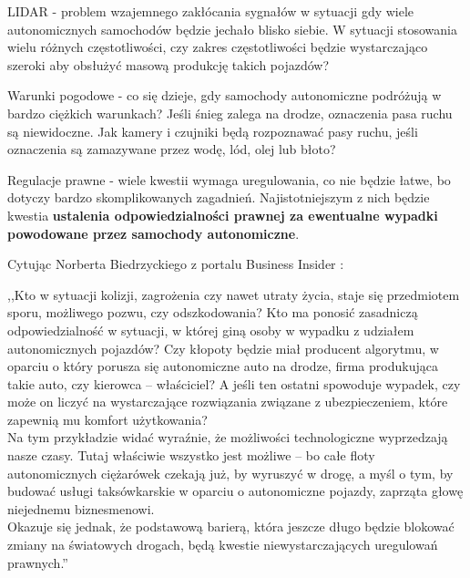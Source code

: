 \begin{enumerate*}
\item LIDAR - problem wzajemnego zakłócania sygnałów w sytuacji gdy wiele autonomicznych samochodów będzie jechało blisko siebie. W sytuacji stosowania wielu różnych częstotliwości, czy zakres częstotliwości będzie wystarczająco szeroki aby obsłużyć masową produkcję takich pojazdów?
\item Warunki pogodowe - co się dzieje, gdy samochody autonomiczne podróżują w bardzo ciężkich warunkach? Jeśli śnieg zalega na drodze, oznaczenia pasa ruchu są niewidoczne. Jak kamery i czujniki będą rozpoznawać pasy ruchu, jeśli oznaczenia są zamazywane przez wodę, lód, olej lub błoto?
\item Regulacje prawne - wiele kwestii wymaga uregulowania, co nie będzie łatwe, bo dotyczy bardzo skomplikowanych zagadnień. Najistotniejszym z nich będzie kwestia \textbf{ustalenia odpowiedzialności prawnej za ewentualne wypadki powodowane przez samochody autonomiczne}.

\newpage
Cytując Norberta Biedrzyckiego z portalu Business Insider \cite{businessInsider:autonomiczneAutaPrawo}: \\
\begin{itshape}
,,Kto w sytuacji kolizji, zagrożenia czy nawet utraty życia, staje się przedmiotem sporu, możliwego pozwu, czy odszkodowania? Kto ma ponosić zasadniczą odpowiedzialność w sytuacji, w której giną osoby w wypadku z udziałem autonomicznych pojazdów? Czy kłopoty będzie miał producent algorytmu, w oparciu o który porusza się autonomiczne auto na drodze, firma produkująca takie auto, czy kierowca – właściciel? A jeśli ten ostatni spowoduje wypadek, czy może on liczyć na wystarczające rozwiązania związane z ubezpieczeniem, które zapewnią mu komfort użytkowania? \\

Na tym przykładzie widać wyraźnie, że możliwości technologiczne wyprzedzają nasze czasy. Tutaj właściwie wszystko jest możliwe – bo całe floty autonomicznych ciężarówek czekają już, by wyruszyć w drogę, a myśl o tym, by budować usługi taksówkarskie w oparciu o autonomiczne pojazdy, zaprząta głowę niejednemu biznesmenowi. \\

Okazuje się jednak, że podstawową barierą, która jeszcze długo będzie blokować zmiany na światowych drogach, będą kwestie niewystarczających uregulowań prawnych.''
\end{itshape}
\end{enumerate*}

